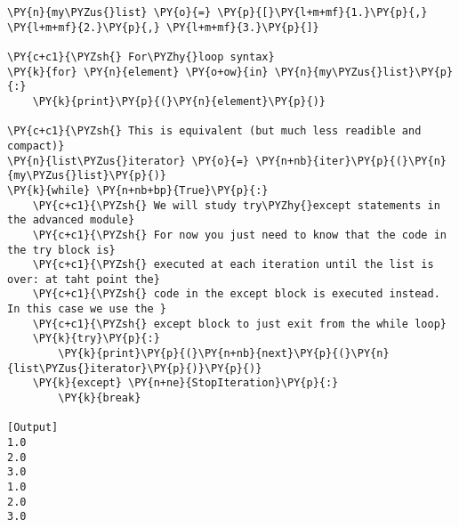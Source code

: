 \begin{Verbatim}[label=\makebox{\url{https://bitbucket.org/lbaldini/programming/src/tip/snippets/show\_iterator.py}},commandchars=\\\{\}]
\PY{n}{my\PYZus{}list} \PY{o}{=} \PY{p}{[}\PY{l+m+mf}{1.}\PY{p}{,} \PY{l+m+mf}{2.}\PY{p}{,} \PY{l+m+mf}{3.}\PY{p}{]}

\PY{c+c1}{\PYZsh{} For\PYZhy{}loop syntax}
\PY{k}{for} \PY{n}{element} \PY{o+ow}{in} \PY{n}{my\PYZus{}list}\PY{p}{:}
    \PY{k}{print}\PY{p}{(}\PY{n}{element}\PY{p}{)}

\PY{c+c1}{\PYZsh{} This is equivalent (but much less readible and compact)}
\PY{n}{list\PYZus{}iterator} \PY{o}{=} \PY{n+nb}{iter}\PY{p}{(}\PY{n}{my\PYZus{}list}\PY{p}{)}
\PY{k}{while} \PY{n+nb+bp}{True}\PY{p}{:}
    \PY{c+c1}{\PYZsh{} We will study try\PYZhy{}except statements in the advanced module}
    \PY{c+c1}{\PYZsh{} For now you just need to know that the code in the try block is}
    \PY{c+c1}{\PYZsh{} executed at each iteration until the list is over: at taht point the}
    \PY{c+c1}{\PYZsh{} code in the except block is executed instead. In this case we use the }
    \PY{c+c1}{\PYZsh{} except block to just exit from the while loop}
    \PY{k}{try}\PY{p}{:}
        \PY{k}{print}\PY{p}{(}\PY{n+nb}{next}\PY{p}{(}\PY{n}{list\PYZus{}iterator}\PY{p}{)}\PY{p}{)}
    \PY{k}{except} \PY{n+ne}{StopIteration}\PY{p}{:}
        \PY{k}{break}

[Output]
1.0
2.0
3.0
1.0
2.0
3.0
\end{Verbatim}